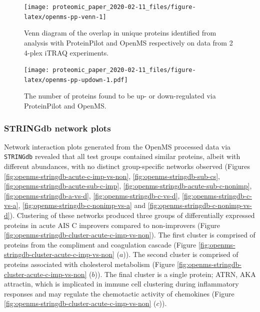 \documentclass[9pt,lineno]{elife}
\begin{document}
\begin{figure}

{\centering \texttt{[image: proteomic\_paper\_2020-02-11\_files/figure-latex/openms-pp-venn-1]} 

}

\caption{Venn diagram of the overlap in unique proteins identified from analysis with ProteinPilot and OpenMS respectively on data from 2 4-plex iTRAQ experiments.}\label{fig:openms-pp-venn}
\end{figure}



\begin{figure}
\centering
\texttt{[image: proteomic\_paper\_2020-02-11\_files/figure-latex/openms-pp-updown-1.pdf]}
\caption{\label{fig:openms-pp-updown}The number of proteins found to be up- or down-regulated via ProteinPilot and OpenMS.}
\end{figure}

\clearpage

\hypertarget{stringdb-network-plots}{%
\subsubsection{STRINGdb network plots}\label{stringdb-network-plots}}

Network interaction plots generated from the OpenMS processed data via \texttt{STRINGdb} revealed that all test groups contained similar proteins, albeit with different abundances, with no distinct group-specific networks observed (Figures \ref{fig:openms-stringdb-acute-c-imp-vs-non}, \ref{fig:openms-stringdb-sub-cs}, \ref{fig:openms-stringdb-acute-sub-c-imp}, \ref{fig:openms-stringdb-acute-sub-c-nonimp}, \ref{fig:openms-stringdb-a-vs-d}, \ref{fig:openms-stringdb-c-vs-d}, \ref{fig:openms-stringdb-c-vs-a}, \ref{fig:openms-stringdb-c-nonimp-vs-a} and \ref{fig:openms-stringdb-c-nonimp-vs-d}).
Clustering of these networks produced three groups of differentially expressed proteins in acute AIS C improvers compared to non-improvers (Figure \ref{fig:openms-stringdb-cluster-acute-c-imp-vs-non}).
The first cluster is comprised of proteins from the compliment and coagulation cascade (Figure \ref{fig:openms-stringdb-cluster-acute-c-imp-vs-non} (\(a\))).
The second cluster is comprised of proteins associated with cholesterol metabolism (Figure \ref{fig:openms-stringdb-cluster-acute-c-imp-vs-non} (\(b\))).
The final cluster is a single protein; ATRN, AKA attractin, which is implicated in immune cell clustering during inflammatory responses and may regulate the chemotactic activity of chemokines (Figure \ref{fig:openms-stringdb-cluster-acute-c-imp-vs-non} (\(c\))).
\end{document}
